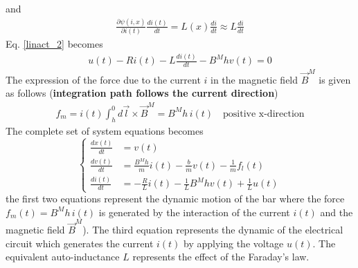 \documentclass[11pt,a4paper,oneside]{book}
\numberwithin{equation}{section}
\theoremstyle{it}
\theoremstyle{definition}
\begin{document}
and 
\begin{equation}\label{linact_6}
	\begin{aligned}
		\frac{\partial\psi(i,x)}{\partial i(t)}\frac{d i(t)}{d t} =L(x) 
		\frac{di}{dt} \approx L\frac{di}{dt}
	\end{aligned}
\end{equation}
Eq. \ref{linact_2} becomes
\begin{equation}\label{linact_7}
	\begin{aligned}
		u(t) - Ri(t)-L\frac{di(t)}{dt}-B^Mhv(t)=0
	\end{aligned}
\end{equation}
The expression of the force due to the current $i$ in the magnetic field 
$\vec{B}^M$ is given as follows (\textbf{integration path follows the current 
	direction})
\begin{equation}\label{linact_8}
	\begin{aligned}
		f_m=i(t)\int_{h}^{0}d\vec{l}\times\vec{B}^M=B^Mh\,i(t)\quad 
		\text{positive x-direction}
	\end{aligned}
\end{equation}
The complete set of system equations becomes
\begin{equation}\label{linact_9}
	\left\lbrace \begin{aligned}
		\frac{dx(t)}{dt} &= v(t) \\[6pt]
		\frac{dv(t)}{dt} &= \frac{B^Mh}{m} i(t)-\frac{b}{m} 
		v(t)-\frac{1}{m}f_l(t) \\[6pt]
		\frac{di(t)}{dt} &= -\frac{R}{L}i(t)-\frac{1}{L}B^Mhv(t)+\frac{1}{L}u(t)
	\end{aligned}\right. 
\end{equation}
the first two equations represent the dynamic motion of the bar where the force 
$f_m(t)=B^Mh\,i(t)$ is generated by the interaction of the current $i(t)$ and 
the magnetic field $\vec{B}^M$). The third equation represents the dynamic of 
the electrical circuit which generates the current $i(t)$ by applying the 
voltage $u(t)$. The equivalent auto-inductance $L$ represents the effect of the 
Faraday's law.\\ 
\end{document}
